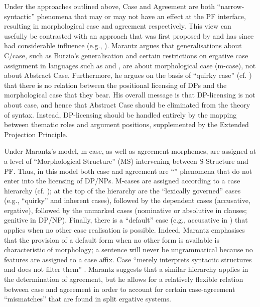 \documentclass[output=paper]{langsci/langscibook}
\begin{document}
Under the approaches outlined above, Case and Agreement are both ``narrow-syntactic'' phenomena that may or may not have an effect at the PF interface, resulting in morphological case and agreement respectively. This view can usefully be contrasted with an approach that was first proposed by \citet{Marantz1991} and has since had considerable influence (e.g., \citealt{Harley1995,Schütze1997,McFadden2004,Bobaljik2008Phi,Baker2010,Titov2012}). Marantz argues that generalisations about C\slash case, such as Burzio’s generalisation \citep{Burzio1986} and certain restrictions on ergative case assignment in languages such as  and , are about morphological case (m-case), not about Abstract Case. Furthermore, he argues on the basis of  ``quirky case'' (cf. \citealt{Zaenen1985}) that there is no relation between the positional licensing of DPs and the morphological case that they bear. His overall message is that DP-licensing is not about case, and hence that Abstract Case should be eliminated from the theory of syntax. Instead, DP-licensing should be handled entirely by the mapping between thematic roles and argument positions, supplemented by the Extended Projection Principle.

Under Marantz’s model, m-case, as well as agreement morphemes, are assigned at a level of ``Morphological Structure'' (MS) intervening between S-Structure and PF. Thus, in this model both case and agreement are ``'' phenomena that do not enter into the licensing of DP\slash NPs. M-cases are assigned according to a case hierarchy (cf. \citealt{Yip1987}); at the top of the hierarchy are the ``lexically governed'' cases (e.g., ``quirky'' and inherent cases), followed by the dependent cases (accusative, ergative), followed by the unmarked cases (nominative or absolutive in clauses; genitive in DP\slash NP). Finally, there is a ``default'' case (e.g., accusative in ) that applies when no other case realisation is possible. Indeed, Marantz emphasises that the provision of a default form when no other form is available is characteristic of morphology; a sentence will never be ungrammatical because no features are assigned to a case affix. Case “merely interprets syntactic structures and does not filter them” \citep[24]{Marantz1991}. Marantz suggests that a similar hierarchy applies in the determination of agreement, but he allows for a relatively flexible relation between case and agreement in order to account for certain case-agreement ``mismatches'' that are found in split ergative systems.
\end{document}
